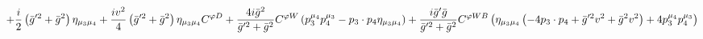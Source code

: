 %
\begin{dmath*}
%
  +  \frac{i}{2}\left({\bar g}^{\prime 2} + {\bar g}{}^2\right) \eta_{\mu_3 \mu_4}  +  \frac{i v^2}{4}\left({\bar g}^{\prime 2} + {\bar g}{}^2\right) \eta_{\mu_3 \mu_4} C^{ \varphi  D}  +  \frac{4 i {\bar g}{}^2}{{\bar g}^{\prime 2} + {\bar g}{}^2}C^{ \varphi  W} \left(p_3^{\mu_4} p_4^{\mu_3} - p_{3}\nobreak\cdot\nobreak{}p_{4} \eta_{\mu_3 \mu_4}\right)  +  \frac{i {\bar g}^\prime {\bar g}{}}{{\bar g}^{\prime 2} + {\bar g}{}^2}C^{ \varphi  WB} \left(\eta_{\mu_3 \mu_4} \left( - 4 p_{3}\nobreak\cdot\nobreak{}p_{4} + {\bar g}^{\prime 2} v^2 + {\bar g}{}^2 v^2\right) + 4 p_3^{\mu_4} p_4^{\mu_3}\right)
%
\end{dmath*}
%
